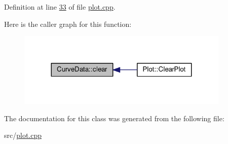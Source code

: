 Definition at line \hyperlink{plot_8cpp_source_l00033}{33} of file \hyperlink{plot_8cpp_source}{plot.\+cpp}.



Here is the caller graph for this function\+:
\nopagebreak
\begin{figure}[H]
\begin{center}
\leavevmode
\includegraphics[width=287pt]{classCurveData_ae898810872a274a681ab60131ecf922b_icgraph}
\end{center}
\end{figure}




The documentation for this class was generated from the following file\+:\begin{DoxyCompactItemize}
\item 
src/\hyperlink{plot_8cpp}{plot.\+cpp}\end{DoxyCompactItemize}

